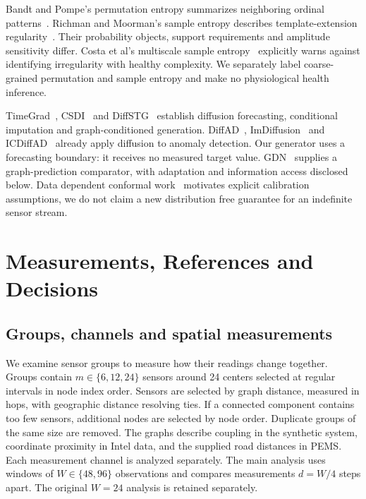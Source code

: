 \documentclass{llncs}
\begin{document}
Bandt and Pompe's permutation entropy summarizes neighboring ordinal
patterns~\cite{bandt2002}. Richman and Moorman's sample entropy describes
template-extension regularity~\cite{richman2000}. Their probability objects,
support requirements and amplitude sensitivity differ. Costa et al's
multiscale sample entropy~\cite{costa2002} explicitly warns against identifying
irregularity with healthy complexity. We separately label coarse-grained
permutation and sample entropy and make no physiological health inference.

TimeGrad~\cite{timegrad}, CSDI~\cite{csdi} and DiffSTG~\cite{diffstg} establish
diffusion forecasting, conditional imputation and graph-conditioned generation.
DiffAD~\cite{diffad}, ImDiffusion~\cite{imdiffusion} and
ICDiffAD~\cite{icdiffad} already apply diffusion to anomaly detection. Our
generator uses a forecasting boundary: it receives no measured target value.
GDN~\cite{gdn} supplies a graph-prediction comparator, with adaptation and
information access disclosed below. Data dependent conformal
work~\cite{conformal} motivates explicit calibration assumptions, we do not
claim a new distribution free guarantee for an indefinite sensor stream.




\section{Measurements, References and Decisions}



\subsection{Groups, channels and spatial measurements}
We examine sensor groups to measure how their readings change together.
Groups contain $m\in\{6,12,24\}$ sensors around 24 centers selected at
regular intervals in node index order. Sensors are selected by graph
distance, measured in hops, with geographic distance resolving ties.
If a connected component contains too few sensors, additional nodes are
selected by node order. Duplicate groups of the same size are removed.
The graphs describe coupling in the synthetic system, coordinate proximity
in Intel data, and the supplied road distances in PEMS. Each measurement
channel is analyzed separately. The main analysis uses windows of
$W\in\{48,96\}$ observations and compares measurements $d=W/4$ steps
apart. The original $W=24$ analysis is retained separately.
\end{document}
